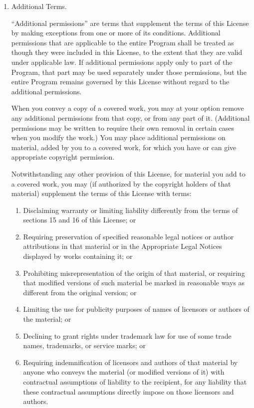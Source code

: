 \begin{enumerate}
\item Additional Terms.

``Additional permissions'' are terms that supplement the terms of this
License by making exceptions from one or more of its conditions.
Additional permissions that are applicable to the entire Program shall
be treated as though they were included in this License, to the extent
that they are valid under applicable law.  If additional permissions
apply only to part of the Program, that part may be used separately
under those permissions, but the entire Program remains governed by
this License without regard to the additional permissions.

When you convey a copy of a covered work, you may at your option
remove any additional permissions from that copy, or from any part of
it.  (Additional permissions may be written to require their own
removal in certain cases when you modify the work.)  You may place
additional permissions on material, added by you to a covered work,
for which you have or can give appropriate copyright permission.

Notwithstanding any other provision of this License, for material you
add to a covered work, you may (if authorized by the copyright holders of
that material) supplement the terms of this License with terms:
  \begin{enumerate}
  \item Disclaiming warranty or limiting liability differently from the
  terms of sections 15 and 16 of this License; or

  \item Requiring preservation of specified reasonable legal notices or
  author attributions in that material or in the Appropriate Legal
  Notices displayed by works containing it; or

  \item Prohibiting misrepresentation of the origin of that material, or
  requiring that modified versions of such material be marked in
  reasonable ways as different from the original version; or

  \item Limiting the use for publicity purposes of names of licensors or
  authors of the material; or

  \item Declining to grant rights under trademark law for use of some
  trade names, trademarks, or service marks; or

  \item Requiring indemnification of licensors and authors of that
  material by anyone who conveys the material (or modified versions of
  it) with contractual assumptions of liability to the recipient, for
  any liability that these contractual assumptions directly impose on
  those licensors and authors.
  \end{enumerate}


\end{enumerate}

